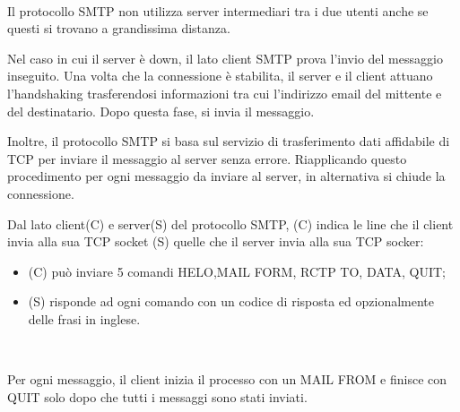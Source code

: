 \documentclass{book}
\begin{document}
{}

\begin{remark}
  \
  
  Il protocollo SMTP non utilizza server intermediari tra i due utenti anche
  se questi si trovano a grandissima distanza.
\end{remark}

Nel caso in cui il server {\`e} down, il lato client SMTP prova l'invio del
messaggio inseguito. Una volta che la connessione {\`e} stabilita, il server e
il client attuano l'handshaking trasferendosi informazioni tra cui l'indirizzo
email del mittente e del destinatario. Dopo questa fase, si invia il
messaggio.

Inoltre, il protocollo SMTP si basa sul servizio di trasferimento dati
affidabile di TCP per inviare il messaggio al server senza errore.
Riapplicando questo procedimento per ogni messaggio da inviare al server, in
alternativa si chiude la connessione.

Dal lato client(C) e server(S) del protocollo SMTP, (C) indica le line che il
client invia alla sua TCP socket (S) quelle che il server invia alla sua TCP
socker:
\begin{itemize}
  \item (C) pu{\`o} inviare 5 comandi HELO,MAIL FORM, RCTP TO, DATA, QUIT;
  
  \item (S) risponde ad ogni comando con un codice di risposta ed
  opzionalmente delle frasi in inglese.
\end{itemize}
\begin{note}
  \
  
  Per ogni messaggio, il client inizia il processo con un MAIL FROM e finisce
  con QUIT solo dopo che tutti i messaggi sono stati inviati.
\end{note}
\end{document}
